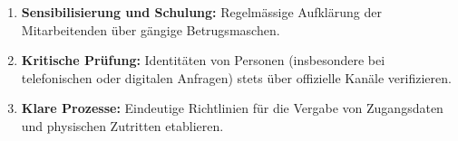 \documentclass[12pt,a4paper]{article}
\begin{document}
\begin{enumerate}
    \item \textbf{Sensibilisierung und Schulung:} Regelmässige Aufklärung der Mitarbeitenden über gängige Betrugsmaschen.
    \item \textbf{Kritische Prüfung:} Identitäten von Personen (insbesondere bei telefonischen oder digitalen Anfragen) stets über offizielle Kanäle verifizieren.
    \item \textbf{Klare Prozesse:} Eindeutige Richtlinien für die Vergabe von Zugangsdaten und physischen Zutritten etablieren.
\end{enumerate}

\printbibliography

\printglossary[type=\acronymtype, title=Akronyme]
\printglossary[title=Glossar]
\end{document}
